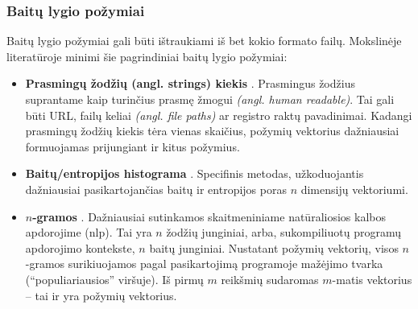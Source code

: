 \subsubsection{Baitų lygio požymiai}\label{sec:literature:features:byte}
Baitų lygio požymiai gali būti ištraukiami iš bet kokio formato failų. Mokslinėje literatūroje minimi šie pagrindiniai baitų lygio požymiai:
\begin{itemize}
    \item \textbf{Prasmingų žodžių (angl. strings) kiekis} \cite{andersonLearningEvadeStatic2018}. Prasmingus žodžius suprantame kaip turinčius prasmę žmogui \textit{(angl. human readable)}. Tai gali būti URL, failų keliai \textit{(angl. file paths)} ar registro raktų pavadinimai. Kadangi prasmingų žodžių kiekis tėra vienas skaičius, požymių vektorius dažniausiai formuojamas prijungiant ir kitus požymius.
    \item \textbf{Baitų/entropijos histograma} \cite{saxeDeepNeuralNetwork2015}. Specifinis metodas, užkoduojantis dažniausiai pasikartojančias baitų ir entropijos poras $n$ dimensijų vektoriumi.
    \item \textbf{$n$-gramos} \cite{zhuNgramMalGANEvading2022}. Dažniausiai sutinkamos skaitmeniniame natūraliosios kalbos apdorojime (\gls{nlp}). Tai yra $n$ žodžių junginiai, arba, sukompiliuotų programų apdorojimo kontekste, $n$ baitų junginiai. Nustatant požymių vektorių, visos $n$-gramos surikiuojamos pagal pasikartojimą programoje mažėjimo tvarka (\enquote{populiariausios} viršuje). Iš pirmų $m$ reikšmių sudaromas $m$-matis vektorius -- tai ir yra požymių vektorius.
\end{itemize}